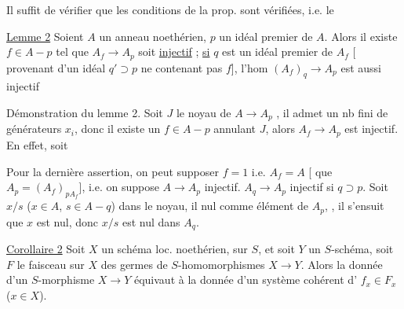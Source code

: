Il suffit de vérifier que les conditions de la prop. sont vérifiées, i.e.  le

\uline{Lemme 2} Soient $A$ un anneau noethérien, $p$ un idéal premier de $A$. Alors il existe $f\in A-p$ tel que $A_f\to A_p$ soit \uline{injectif} ;
\uline{si}   $q$ est un idéal premier de $A_f$  [ provenant d'un idéal $q'\supset p$ ne contenant pas $f$],  l'hom $(A_f)_q\to A_p$ est aussi injectif

Démonstration du lemme 2. Soit $J$ le noyau de $A\to A_p$ , il admet un nb fini de générateurs $x_i$, donc il existe un $f\in A-p$ annulant $J$,   alors $A_f\to A_p$ est injectif. En effet, soit    

Pour la dernière assertion, on peut supposer $f=1$  i.e. $A_f=A$ [  que $A_p=(A_f)_{pA_f}$], i.e. on suppose $A\to A_p$ injectif.  $A_q\to A_p$ injectif si $q\supset p$. Soit $x/s$ ($x\in A$, $s\in A-q$) dans le noyau,  il   nul comme élément de $A_p$,  , il s'ensuit que $x$ est nul, donc $x/s$ est nul dans $A_q$.

\uline{Corollaire 2} Soit $X$ un schéma loc. noethérien,  sur $S$, et soit $Y$ un $S$-schéma, soit $F$ le  faisceau sur $X$ des germes de $S$-homomorphismes $X\to Y$. Alors la donnée d'un $S$-morphisme $X\to Y$ équivaut à la donnée d'un système cohérent d' $f_x\in F_x$ ($x\in X$).

